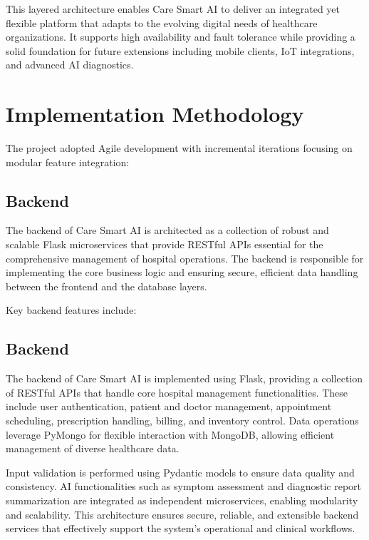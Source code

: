 \documentclass[conference]{IEEEtran}
\begin{document}
This layered architecture enables Care Smart AI to deliver an integrated yet flexible platform that adapts to the evolving digital needs of healthcare organizations. It supports high availability and fault tolerance while providing a solid foundation for future extensions including mobile clients, IoT integrations, and advanced AI diagnostics.


\section{Implementation Methodology}

The project adopted Agile development with incremental iterations focusing on modular feature integration:

\subsection{Backend}

The backend of Care Smart AI is architected as a collection of robust and scalable Flask microservices that provide RESTful APIs essential for the comprehensive management of hospital operations. The backend is responsible for implementing the core business logic and ensuring secure, efficient data handling between the frontend and the database layers.

Key backend features include:

\subsection{Backend}

The backend of Care Smart AI is implemented using Flask, providing a collection of RESTful APIs that handle core hospital management functionalities. These include user authentication, patient and doctor management, appointment scheduling, prescription handling, billing, and inventory control. Data operations leverage PyMongo for flexible interaction with MongoDB, allowing efficient management of diverse healthcare data.

Input validation is performed using Pydantic models to ensure data quality and consistency. AI functionalities such as symptom assessment and diagnostic report summarization are integrated as independent microservices, enabling modularity and scalability. This architecture ensures secure, reliable, and extensible backend services that effectively support the system's operational and clinical workflows.
\end{document}
